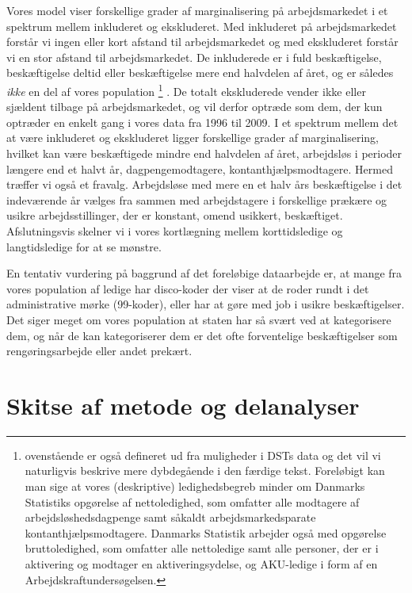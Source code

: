 Vores model viser forskellige grader af marginalisering på arbejdsmarkedet i et spektrum mellem inkluderet og ekskluderet. Med inkluderet på arbejdsmarkedet forstår vi ingen eller kort afstand til arbejdsmarkedet og med ekskluderet forstår vi en stor afstand til arbejdsmarkedet. De inkluderede er i fuld beskæftigelse, beskæftigelse deltid eller beskæftigelse mere end halvdelen af året, og er således \emph{ikke} en del af vores population%
%
\footnote{ovenstående er også defineret ud fra muligheder i DSTs data og det vil vi naturligvis beskrive mere dybdegående i den færdige tekst. Foreløbigt kan man sige at vores (deskriptive) ledighedsbegreb minder om Danmarks Statistiks opgørelse af nettoledighed, som omfatter alle modtagere af arbejdsløshedsdagpenge samt såkaldt arbejdsmarkedsparate kontanthjælpsmodtagere. Danmarks Statistik arbejder også med opgørelse bruttoledighed, som  omfatter alle nettoledige samt alle personer, der er i aktivering og modtager en aktiveringsydelse, og AKU-ledige i form af en Arbejdskraftundersøgelsen.}%
%
. De totalt ekskluderede vender ikke eller sjældent tilbage på arbejdsmarkedet, og vil derfor optræde som dem, der kun optræder en enkelt gang i vores data fra 1996 til 2009. I et spektrum mellem det at være inkluderet og ekskluderet ligger forskellige grader af marginalisering, hvilket kan være beskæftigede mindre end halvdelen af året, arbejdsløs i perioder længere end et halvt år, dagpengemodtagere, kontanthjælpsmodtagere. Hermed træffer vi også et fravalg. Arbejdsløse med mere en et halv års beskæftigelse i det indeværende år vælges fra sammen med arbejdstagere i forskellige prækære og usikre arbejdsstillinger, der er konstant, omend usikkert, beskæftiget. Afslutningsvis skelner vi i vores kortlægning mellem korttidsledige og langtidsledige for at se mønstre.

En tentativ vurdering på baggrund af det foreløbige dataarbejde er, at mange fra vores population af ledige har disco-koder der viser at de roder rundt i det administrative mørke (99-koder), eller har at gøre med job i usikre beskæftigelser. Det siger meget om vores population at staten har så svært ved at kategorisere dem, og når de kan kategoriserer dem er det ofte forventelige beskæftigelser som rengøringsarbejde eller andet prekært.   





\section{Skitse af metode og delanalyser \label{}} 

